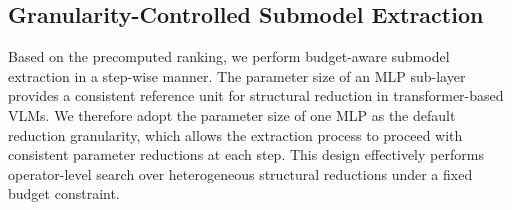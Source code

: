 \documentclass[11pt]{article}
\begin{document}







\subsection{Granularity-Controlled Submodel Extraction}

Based on the precomputed ranking, we perform budget-aware submodel extraction in a step-wise manner. The parameter size of an MLP sub-layer provides a consistent reference unit for structural reduction in transformer-based VLMs. We therefore adopt the parameter size of one MLP as the default reduction granularity, which allows the extraction process to proceed with consistent parameter reductions at each step. This design effectively performs operator-level search
over heterogeneous structural reductions under a fixed
budget constraint.
\end{document}
